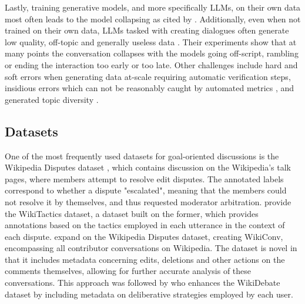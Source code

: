 Lastly, training generative models, and more specifically LLMs, on their own data most often leads to the model collapsing \cite{alemohammad2023selfconsuminggenerativemodelsmad, shumailov2024curserecursiontraininggenerated} as cited by \cite{ulmer2024bootstrappingllmbasedtaskorienteddialogue}. Additionally, even when not trained on their own data, LLMs tasked with creating dialogues often generate low quality, off-topic and generally useless data \cite{ulmer2024bootstrappingllmbasedtaskorienteddialogue}. Their experiments show that at many points the conversation collapses with the models going off-script, rambling or ending the interaction too early or too late. Other challenges include hard and soft errors when generating data at-scale \cite{lambert2024selfdirectedsyntheticdialoguesrevisions, ulmer2024bootstrappingllmbasedtaskorienteddialogue} requiring automatic verification steps, insidious errors which can not be reasonably caught by automated metrics \cite{lambert2024selfdirectedsyntheticdialoguesrevisions, ulmer2024bootstrappingllmbasedtaskorienteddialogue}, and generated topic diversity \cite{lambert2024selfdirectedsyntheticdialoguesrevisions}.


\subsection{Datasets}
\label{sec:related:datasets}


One of the most frequently used datasets for goal-oriented discussions is the Wikipedia Disputes dataset \cite{de-kock-vlachos-2021-beg}, which contains discussion on the Wikipedia's talk pages, where members attempt to resolve edit disputes. The annotated labels correspond to whether a dispute "escalated", meaning that the members could not resolve it by themselves, and thus requested moderator arbitration. \cite{dekock2022disagree} provide the WikiTactics dataset, a dataset built on the former, which provides annotations based on the tactics employed in each utterance in the context of each dispute. \cite{hua2018wikiconvcorpuscompleteconversational} expand on the Wikipedia Disputes dataset, creating WikiConv, encompassing all contributor conversations on Wikipedia. The dataset is novel in that it includes metadata concerning edits, deletions and other actions on the comments themselves, allowing for further accurate analysis of these conversations. This approach was followed by \cite{al-khatib-etal-2018-modeling} who enhances the WikiDebate dataset by including metadata on deliberative strategies employed by each user.

